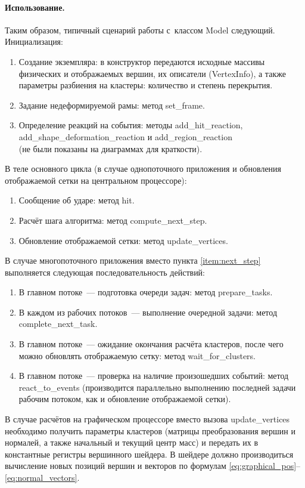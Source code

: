 \documentclass[a4paper, 14pt, titlepage]{extarticle}
\begin{document}
        \paragraph{Использование.}
        Таким образом, типичный сценарий работы с~классом Model следующий. Инициализация:
        \begin{enumerate}
          \item Создание экземпляра: в конструктор передаются исходные массивы физических и
          отображаемых вершин, их описатели (VertexInfo), а также параметры разбиения на кластеры:
          количество и степень перекрытия.
          \item Задание недеформируемой рамы: метод set\_frame.
          \item Определение реакций на события: методы add\_hit\_reaction,\\
          add\_shape\_deformation\_reaction и add\_region\_reaction\\
          (не были показаны на диаграммах для краткости).
        \end{enumerate}
        В теле основного цикла (в случае однопоточного приложения и обновления отображаемой сетки на
        центральном процессоре):
        \begin{enumerate}
          \item Сообщение об ударе: метод hit.
          \item Расчёт шага алгоритма: метод compute\_next\_step. \label{item:next_step}
          \item Обновление отображаемой сетки: метод update\_vertices.
        \end{enumerate}
        В случае многопоточного приложения вместо пункта \ref{item:next_step} выполняется следующая
        последовательность действий:
        \begin{enumerate}
          \item В главном потоке~--- подготовка очереди задач: метод prepare\_tasks.
          \item В каждом из рабочих потоков~--- выполнение очередной задачи: метод complete\_next\_task.
          \item В главном потоке~--- ожидание окончания расчёта кластеров, после чего можно
            обновлять отображаемую сетку: метод wait\_for\_clusters.
          \item В главном потоке~--- проверка на наличие произошедших событий: метод
            react\_to\_events (производится параллельно выполнению последней задачи рабочим потоком,
            как и обновление отображаемой сетки).
        \end{enumerate}
        В случае расчётов на графическом процессоре вместо вызова update\_vertices необходимо
        получить параметры кластеров (матрицы преобразования вершин и нормалей, а также начальный и
        текущий центр масс) и передать их в константные регистры вершинного шейдера. В шейдере
        должно производиться вычисление новых позиций вершин и векторов по формулам
        \eqref{eq:graphical_pos}--\eqref{eq:normal_vectors}.
\end{document}
